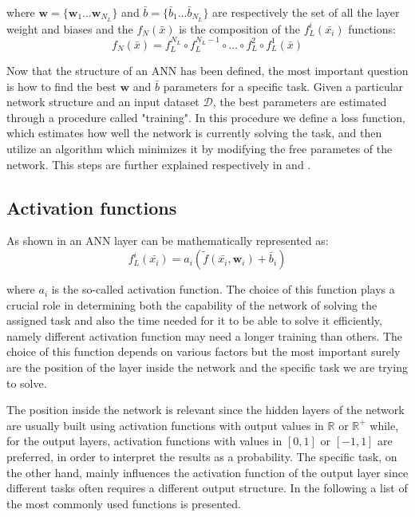 where $\boldsymbol{w} = \{\boldsymbol{w}_1 \dots \boldsymbol{w}_{N_L}\}$ and 
$ \bar{b} = \{ \bar{b}_1 \dots  \bar{b}_{N_L}\}$ are respectively the set of all the layer weight and biases and the $f_N(\bar{x})$ is the composition of the $f_L^i(\bar{x_i})$
functions:
\begin{equation}
    f_N(\bar{x}) = f_L^{N_L} \circ f_L^{N_L-1}\circ\dots\circ f_L^2\circ f_L^1 (\bar{x}) 
\end{equation}

Now that the structure of an ANN has been defined, the most important question is how to find the best $\boldsymbol{w}$ and $\bar{b}$ parameters for a specific task.
Given a particular network structure and an input dataset $\mathcal{D}$, the best parameters  are estimated through a procedure called "training". In this procedure we define a loss function, which estimates how well the network is currently solving the task, and then utilize an algorithm which minimizes it by modifying the free parametes of the network. This steps are further explained respectively in 
and .

\subsection{Activation functions}\label{activations}

As shown in  an ANN layer can be mathematically represented as:
\begin{equation}
    f_L^i (\bar{x_i})=a_i \left( \tilde{f}(\bar{x_i}, \boldsymbol{w}_i) + \bar{b}_i \right) 
    \label{eq:layer_math}
\end{equation}

where $a_i$ is the so-called activation function. The choice of this function plays a crucial role in determining both the capability of the network of solving the assigned task and also  the time needed for it to be able to solve it efficiently, namely different activation function may need a longer training than others. The choice of this function depends on various factors but the most important surely are the position of the layer inside the network and the specific task we are trying to solve.

The position inside the network is relevant since the hidden layers of the network are usually built using activation functions with output values in $\mathbb{R}$ or $\mathbb{R}^+$ while, for the output layers, activation functions with values in $[0,1]$ or $[-1,1]$ are preferred, in order to interpret the results as a probability.
The specific task, on the other hand, mainly influences the activation function of the output layer since different tasks often requires a different output structure.
In the following a list of the most commonly used functions is presented.


